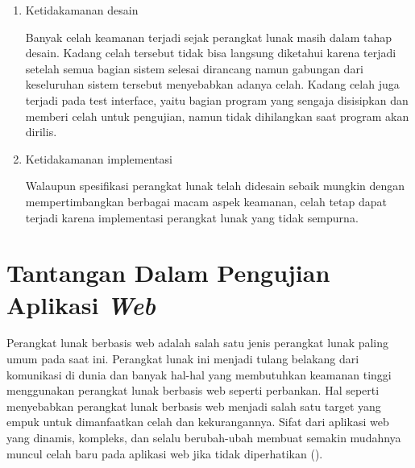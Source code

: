 \begin{enumerate}
      \item Ketidakamanan desain

            Banyak celah keamanan terjadi sejak perangkat lunak masih dalam tahap desain.
            Kadang celah tersebut tidak bisa langsung diketahui karena terjadi setelah semua
            bagian sistem selesai dirancang namun gabungan dari keseluruhan sistem tersebut
            menyebabkan adanya celah.
            Kadang celah juga terjadi pada test interface, yaitu bagian program yang sengaja
            disisipkan dan memberi celah untuk pengujian, namun tidak dihilangkan saat program akan dirilis.

      \item Ketidakamanan implementasi

            Walaupun spesifikasi perangkat lunak telah didesain sebaik mungkin dengan
            mempertimbangkan berbagai macam aspek keamanan,
            celah tetap dapat terjadi karena implementasi perangkat lunak yang tidak sempurna.

\end{enumerate}

\section{Tantangan Dalam Pengujian Aplikasi \emph{Web}}

Perangkat lunak berbasis web adalah salah satu jenis perangkat lunak paling umum pada saat ini.
Perangkat lunak ini menjadi tulang belakang dari komunikasi di dunia dan banyak hal-hal
yang membutuhkan keamanan tinggi menggunakan perangkat lunak berbasis web seperti perbankan.
Hal seperti menyebabkan perangkat lunak berbasis web menjadi salah satu target yang empuk untuk
dimanfaatkan celah dan kekurangannya. Sifat dari aplikasi web yang dinamis, kompleks, dan
selalu berubah-ubah membuat semakin mudahnya muncul celah baru
pada aplikasi web jika tidak diperhatikan (\cite{websecchal}).

